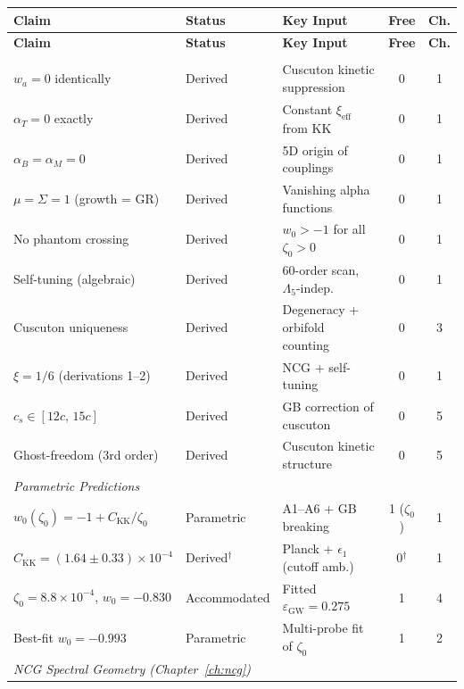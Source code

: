 \documentclass[10pt,a4paper,openany,twocolumn]{book}
\theoremstyle{definition}
\theoremstyle{remark}
\begin{document}
\begin{center}
\small
\begin{longtable}{p{4.8cm} l p{4.2cm} c c}
\hline
\textbf{Claim} & \textbf{Status} & \textbf{Key Input} & \textbf{Free} & \textbf{Ch.} \\
\hline
\endfirsthead
\hline
\textbf{Claim} & \textbf{Status} & \textbf{Key Input} & \textbf{Free} & \textbf{Ch.} \\
\hline
\endhead
\hline
\endfoot
\multicolumn{5}{l}{\emph{Core Cosmological Framework (Chapters~\ref{ch:foundation}, \ref{ch:nogo}, \ref{ch:sound-speed})}} \\[3pt]
$w_a = 0$ identically & Derived & Cuscuton kinetic suppression & 0 & 1 \\
$\alpha_T = 0$ exactly & Derived & Constant $\xi_\mathrm{eff}$ from KK & 0 & 1 \\
$\alpha_B = \alpha_M = 0$ & Derived & 5D origin of couplings & 0 & 1 \\
$\mu = \Sigma = 1$ (growth = GR) & Derived & Vanishing alpha functions & 0 & 1 \\
No phantom crossing & Derived & $w_0 > -1$ for all $\zeta_0 > 0$ & 0 & 1 \\
Self-tuning (algebraic) & Derived & 60-order scan, $\Lambda_5$-indep. & 0 & 1 \\
Cuscuton uniqueness & Derived & Degeneracy + orbifold counting & 0 & 3 \\
$\xi = 1/6$ (derivations 1--2) & Derived & NCG + self-tuning & 0 & 1 \\
$c_s \in [12c,\, 15c]$ & Derived & GB correction of cuscuton & 0 & 5 \\
Ghost-freedom (3rd order) & Derived & Cuscuton kinetic structure & 0 & 5 \\[6pt]
\multicolumn{5}{l}{\emph{Parametric Predictions}} \\[3pt]
$w_0(\zeta_0) = -1 + C_\mathrm{KK}/\zeta_0$ & Parametric & A1--A6 + GB breaking & 1 ($\zeta_0$) & 1 \\
$C_\mathrm{KK} = (1.64 \pm 0.33) \times 10^{-4}$ & Derived$^\dag$ & Planck + $\epsilon_1$ (cutoff amb.) & 0$^\dag$ & 1 \\
$\zeta_0 = 8.8 \times 10^{-4}$, $w_0 = -0.830$ & Accommodated & Fitted $\varepsilon_\mathrm{GW} = 0.275$ & 1 & 4 \\
Best-fit $w_0 = -0.993$ & Parametric & Multi-probe fit of $\zeta_0$ & 1 & 2 \\[6pt]
\multicolumn{5}{l}{\emph{NCG Spectral Geometry (Chapter~\ref{ch:ncg})}} \\[3pt]

\end{longtable}
\end{center}
\end{document}
